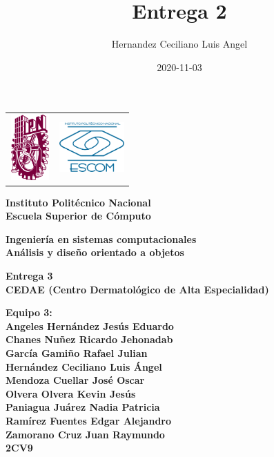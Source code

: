 \documentclass[12pt,letterpaper]{article}
\author{Hernandez Ceciliano Luis Angel}
\title{Entrega 2}
\date {2020-11-03}
\begin{document}
	\pagestyle{plain}
	{
		{
			\begin{tabular}
				{
					p{} 
					p{} 
				}
				\includegraphics[width=1.5cm, height=2.5cm]{ipn.png} &  
				\includegraphics[width=2.5cm, height=2cm]{escom.png}
			\end{tabular}
		}
		\begin{center}
			\par\vspace{1cm} %
			{
				\Huge\textbf
				{
					Instituto Polit\'ecnico Nacional 
					\\[.2cm]Escuela Superior de C\'omputo
				}
			}
			\par\vspace{0.5cm}
			{
				\Large\textbf
				{
					Ingenier\'ia en sistemas computacionales 
					\\[.5cm]An\'alisis y diseño orientado a objetos
				}
			}
			\vfill
			\par\vspace{0.5cm}
			{
				\Large\textbf
				{
					Entrega 3 \\
					CEDAE (Centro Dermatológico de Alta Especialidad)
				}
			}
			\vfill
			\par\vspace{1cm}
			{
				\large\textbf
				{
                    Equipo 3:
                    \\Angeles Hernández Jesús Eduardo
                    \\Chanes Nuñez Ricardo Jehonadab
                    \\García Gamiño Rafael Julian
                    \\Hernández Ceciliano Luis Ángel
                    \\Mendoza Cuellar José Oscar
                    \\Olvera Olvera Kevin Jesús
                    \\Paniagua Juárez Nadia Patricia
                    \\Ramírez Fuentes Edgar Alejandro
                    \\Zamorano Cruz Juan Raymundo
					\\2CV9
				} 
			}
			\par\vspace{3cm}
		\end{center}
		\clearpage
	}
\end{document}
